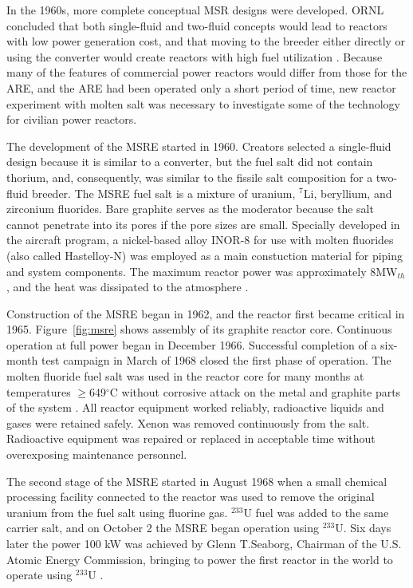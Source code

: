 In the 1960s, more complete conceptual \gls{MSR} designs were developed. \gls{ORNL} concluded that both single-fluid and two-fluid concepts would lead to reactors with low power generation cost, and that moving to the breeder either directly or using the converter would create reactors with high fuel utilization \cite{rosenthal_molten-salt_1970}. Because many of the features of commercial power reactors would differ from those for the \gls{ARE}, and the \gls{ARE} had been operated only a short period of time, new reactor experiment with molten salt was necessary to investigate some of the technology for civilian power reactors.

The development of the \gls{MSRE} started in 1960. Creators selected a single-fluid design because it is similar to a converter, but the fuel salt did not contain thorium, and, consequently, was similar to the fissile salt composition for a two-fluid breeder. The \gls{MSRE} fuel salt is a mixture of uranium, $^7$Li, beryllium, and zirconium fluorides. Bare graphite serves as the moderator because the salt cannot penetrate into its pores if the pore sizes are small. Specially developed in the aircraft program, a nickel-based alloy INOR-8 for use with molten fluorides (also called Hastelloy-N) was employed as a main constuction material for piping and system components. The maximum reactor power was approximately 8MW$_{th}$, and the heat was dissipated to the atmosphere \cite{haubenreich_experience_1970}.

Construction of the \gls{MSRE} began in 1962, and the reactor first became critical in 1965. Figure~\ref{fig:msre} shows assembly of its graphite reactor core. Continuous operation at full power began in December 1966. Successful completion of a six-month test campaign in March of 1968 closed the first phase of operation. The molten fluoride fuel salt was used in the reactor core for many months at temperatures $\geq$649$^{\circ}$C without corrosive attack on the metal and graphite parts of the system \cite{rosenthal_molten-salt_1970}. All reactor equipment worked reliably, radioactive liquids and gases were retained safely. Xenon was removed continuously from the salt. Radioactive equipment was repaired or replaced in acceptable time without overexposing maintenance personnel.

The second stage of the \gls{MSRE} started in August 1968 when a small chemical processing facility connected to the reactor was used to remove the original uranium from the fuel salt using fluorine gas. $^{233}$U fuel was added to the same carrier salt, and on October 2 the \gls{MSRE} began operation using $^{233}$U. Six days later the power 100 kW was achieved by Glenn T.Seaborg, Chairman of the U.S. Atomic Energy Commission, bringing to power the first reactor in the world to operate using $^{233}$U \cite{haubenreich_experience_1970}.

